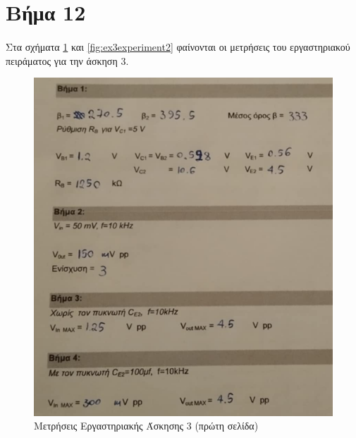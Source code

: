 \documentclass[11pt,a4paper,twoside,onecolumn,openright,final]{memoir}
\begin{document}
\section{Βήμα 12}

\paragraph*{} Στα σχήματα \ref{fig:ex3experiment1} και \ref{fig:ex3experiment2} φαίνονται οι μετρήσεις του εργαστηριακού πειράματος για την άσκηση 3.


\begin{figure}[h]
\centerfloat%
\includegraphics[width=15.0cm]{figures/exercise3experiment1.png}
\caption{Μετρήσεις Εργαστηριακής Άσκησης 3 (πρώτη σελίδα)}\label{fig:ex3experiment1}
\end{figure}
\end{document}
